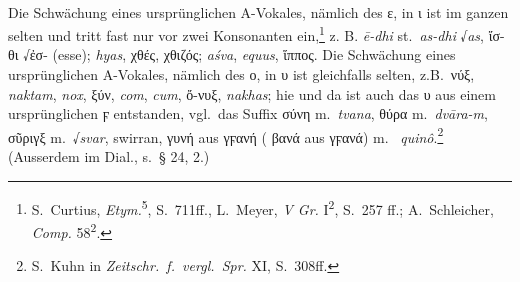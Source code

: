 \paragraph{} Die Schwächung eines ursprünglichen A-Vokales, nämlich des ε, in ι
ist im ganzen selten und tritt fast nur vor zwei Konsonanten ein,\footnote{
  S.\ Curtius, \emph{Etym.}\textsuperscript{5}, S.\ 711ff., L.~Meyer, \emph{V
  Gr.} I\textsuperscript{2}, S.\ 257 ff.; A.~Schleicher, \emph{Comp.}
  58\textsuperscript{2}.
} z. B. 
\emph{ē-dhi} st.\ \emph{as-dhi} √\emph{as}, ἴσ-θι √ἐσ- (esse);
 \emph{hyas}, χθές, χθιζός;
 \emph{aśva},  \emph{equus},  ἵππος.
Die Schwächung eines ursprünglichen A-Vokales,
nämlich des ο, in υ ist gleichfalls selten, z.B.\ νύξ, 
\emph{naktam},  \emph{nox}, ξύν,
 \emph{com}, \emph{cum}, ὄ-νυξ, 
\emph{nakhas}; hie und da ist auch das υ aus einem ursprünglichen ϝ entstanden,
vgl.\ das Suffix σύνη m.\ \emph{tvana}, θύρα m.\ \emph{dvāra-m},
σῦριγξ m.\ √\emph{svar},  swirran, γυνή aus γϝανή
( βανά aus γϝανά) m.\ 
\emph{quinô}.\footnote{
  S.\ Kuhn in \emph{Zeitschr.\ f.\ vergl.\ Spr.} XI, S.\ 308ff.
}
(Ausserdem im  Dial., s.\ § 24, 2.)

